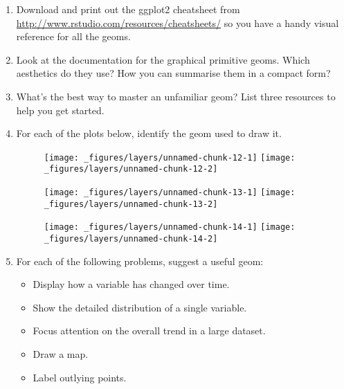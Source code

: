 \begin{enumerate}
\def\labelenumi{\arabic{enumi}.}
\item
  Download and print out the ggplot2 cheatsheet from
  \url{http://www.rstudio.com/resources/cheatsheets/} so you have a
  handy visual reference for all the geoms.
\item
  Look at the documentation for the graphical primitive geoms. Which
  aesthetics do they use? How you can summarise them in a compact form?
\item
  What's the best way to master an unfamiliar geom? List three resources
  to help you get started.
\item
  For each of the plots below, identify the geom used to draw it.

  \begin{figure}[H]
    \texttt{[image: \_figures/layers/unnamed-chunk-12-1]}%
    \texttt{[image: \_figures/layers/unnamed-chunk-12-2]}
  \end{figure}

  \begin{figure}[H]
    \texttt{[image: \_figures/layers/unnamed-chunk-13-1]}%
    \texttt{[image: \_figures/layers/unnamed-chunk-13-2]}
  \end{figure}

  \begin{figure}[H]
    \texttt{[image: \_figures/layers/unnamed-chunk-14-1]}%
    \texttt{[image: \_figures/layers/unnamed-chunk-14-2]}
  \end{figure}
\item
  For each of the following problems, suggest a useful geom:

  \begin{itemize}
  \tightlist
  \item
    Display how a variable has changed over time.
  \item
    Show the detailed distribution of a single variable.
  \item
    Focus attention on the overall trend in a large dataset.
  \item
    Draw a map.
  \item
    Label outlying points.
  \end{itemize}
\end{enumerate}


